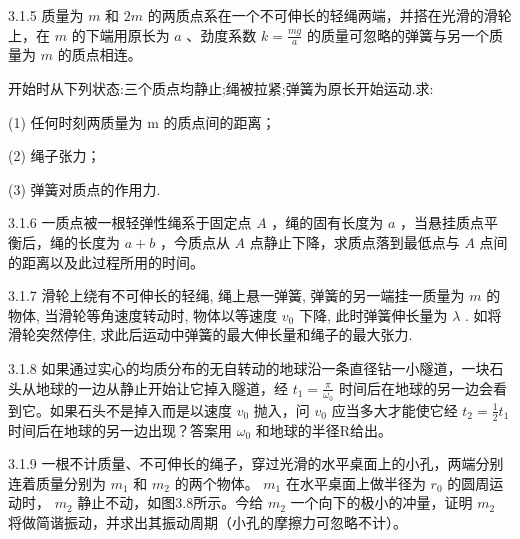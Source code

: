 \begin{problem}{3.1.5}
质量为 $m$ 和 $2m$ 的两质点系在一个不可伸长的轻绳两端，并搭在光滑的滑轮上，在 $m$ 的下端用原长为 $a$ 、劲度系数 $k = \frac{mg}{a}$ 的质量可忽略的弹簧与另一个质量为 $m$ 的质点相连。

开始时从下列状态:三个质点均静止;绳被拉紧;弹簧为原长开始运动.求:

(1) 任何时刻两质量为 m 的质点间的距离；

(2) 绳子张力；

(3) 弹簧对质点的作用力.
\end{problem}
\clearpage


\begin{problem}{3.1.6}
一质点被一根轻弹性绳系于固定点 $A$ ，绳的固有长度为 $a$ ，当悬挂质点平衡后，绳的长度为 $a + b$ ，今质点从 $A$ 点静止下降，求质点落到最低点与 $A$ 点间的距离以及此过程所用的时间。
\end{problem}
\clearpage


\begin{problem}{3.1.7}
滑轮上绕有不可伸长的轻绳, 绳上悬一弹簧, 弹簧的另一端挂一质量为 $m$ 的物体, 当滑轮等角速度转动时, 物体以等速度 $v_{0}$ 下降, 此时弹簧伸长量为 $\lambda$ . 如将滑轮突然停住, 求此后运动中弹簧的最大伸长量和绳子的最大张力.
\begin{center}

\end{center}
\end{problem}
\clearpage


\begin{problem}{3.1.8}
如果通过实心的均质分布的无自转动的地球沿一条直径钻一小隧道，一块石头从地球的一边从静止开始让它掉入隧道，经 $t_{1}=\frac{\pi}{\omega_{0}}$ 时间后在地球的另一边会看到它。如果石头不是掉入而是以速度 $v_{0}$ 抛入，问 $v_{0}$ 应当多大才能使它经 $t_{2}=\frac{1}{2}t_{1}$ 时间后在地球的另一边出现？答案用 $\omega_{0}$ 和地球的半径R给出。
\end{problem}
\clearpage


\begin{problem}{3.1.9}
一根不计质量、不可伸长的绳子，穿过光滑的水平桌面上的小孔，两端分别连着质量分别为 $m_{1}$ 和 $m_{2}$ 的两个物体。 $m_{1}$ 在水平桌面上做半径为 $r_{0}$ 的圆周运动时， $m_{2}$ 静止不动，如图3.8所示。今给 $m_{2}$ 一个向下的极小的冲量，证明 $m_{2}$ 将做简谐振动，并求出其振动周期（小孔的摩擦力可忽略不计）。
\begin{center}

\end{center}
\end{problem}
\clearpage


